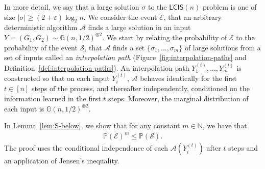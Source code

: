\documentclass[11pt]{article}
\theoremstyle{plain}
\theoremstyle{definition}
\theoremstyle{remark}
\newcommand{\Gnhalf}{\mathbb{G}(n,1/2)}
\newcommand{\N}{\mathbb{N}}
\newcommand{\eps}{\varepsilon}
\newcommand{\MCS}{\mathsf{LCIS}}
\newcommand{\Alg}{\mathcal{A}}
\newcommand{\findOneLarge}{\mathcal{E}}
\newcommand{\findManyLarge}{\mathcal{S}}
\renewcommand{\Pr}{\mathbb{P}}
\begin{document}
In more detail, we say that a large solution $\sigma$ to the $\MCS(n)$ problem is one of size $|\sigma| \geq (2 + \eps)\log_2 n$. We consider the event $\findOneLarge$, that an arbitrary deterministic algorithm $\Alg$ finds a large solution in an input $Y = (G_1, G_2) \sim \Gnhalf^{\otimes 2}$. We start by relating the probability of $\findOneLarge$ to the probability of the event $\findManyLarge$, that $\Alg$ finds a set $\{\sigma_1, \dots, \sigma_m\}$ of large solutions from a set of inputs called an \emph{interpolation path} (Figure~\ref{fig:interpolation-paths} and Definition~\ref{def:interpolation-paths}). An interpolation path $Y_1^{(t)}, \dots, Y_m^{(t)}$ is constructed so that on each input $Y_i^{(t)}$, $\Alg$ behaves identically for the first $t \in [n]$ steps of the process, and thereafter independently, conditioned on the information learned in the first $t$ steps. Moreover, the marginal distribution of each input is $\Gnhalf^{\otimes 2}$. 

In Lemma~\ref{lem:S-below}, we show that for any constant $m \in \N$, we have that 
\begin{align*}
    \Pr(\findOneLarge)^m \leq \Pr(\findManyLarge).
\end{align*}
The proof uses the conditional independence of each $\Alg\left(Y_i^{(t)}\right)$ after $t$ steps and an application of Jensen's inequality.
\end{document}
